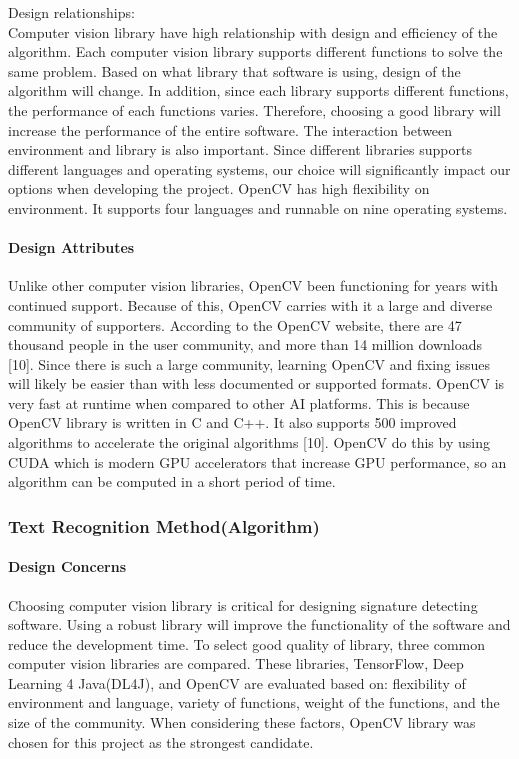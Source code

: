 \documentclass[article, onecolumn, draftclsnofoot,10pt, compsoc]{IEEEtran}
\begin{document}
Design relationships: \\
Computer vision library have high relationship with design and efficiency of the algorithm. Each computer vision library supports different functions to solve the same problem.  Based on what library that software is using, design of the algorithm will change. In addition, since each library supports different functions, the performance of each functions varies. Therefore, choosing a good library will increase the performance of the entire software.
The interaction between environment and library is also important.  Since different libraries supports different languages and operating systems, our choice will significantly impact our options when developing the project. OpenCV has high flexibility on environment. It supports four languages and runnable on nine operating systems.\\

\paragraph{Design Attributes}
Unlike other computer vision libraries, OpenCV been functioning for years with continued support. Because of this, OpenCV carries with it a large and diverse community of supporters. According to the OpenCV website, there are 47 thousand people in the user community, and more than 14 million downloads [10]. Since there is such a large community, learning OpenCV and fixing issues will likely be easier than with less documented or supported formats.
OpenCV is very fast at runtime when compared to other AI platforms. This is because OpenCV library is written in C and C++. It also supports 500 improved algorithms to accelerate the original algorithms [10].  OpenCV do this by using CUDA which is modern GPU accelerators that increase GPU performance, so an algorithm can be computed in a short period of time.\\

\subsubsection{Text Recognition Method(Algorithm)}
\paragraph{Design Concerns}
Choosing computer vision library is critical for designing signature detecting software. Using a robust library will improve the functionality of the software and reduce the development time. To select good quality of library, three common computer vision libraries are compared. These libraries, TensorFlow, Deep Learning 4 Java(DL4J), and OpenCV are evaluated based on: flexibility of environment and language, variety of functions, weight of the functions, and the size of the community. When considering these factors, OpenCV library was chosen for this project as the strongest candidate.
\end{document}
